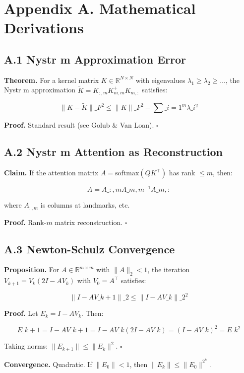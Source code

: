 
\section{Appendix A. Mathematical Derivations}

\subsection{A.1 Nystr m Approximation Error}

\textbf{Theorem.} For a kernel matrix $K \in \mathbb{R}^{N \times N}$ with 
eigenvalues $\lambda_1 \geq \lambda_2 \geq \dots$, the Nystr m 
approximation $\tilde{K} = K_{:, m} K_{m, m}^+ K_{m, :}$ satisfies:

\[
\|K - \tilde{K}\|\_F^2 \leq \|K\|\_F^2 - \sum\_{i=1}^{m} \lambda\_i^2
\tag{A.1}
\]

\textbf{Proof.} Standard result (see Golub \& Van Loan). $\square$

\subsection{A.2 Nystr m Attention as Reconstruction}

\textbf{Claim.} If the attention matrix $A = \text{softmax}(Q K^\top)$ has rank $\leq m$, 
then:

\[
A = A\_{:, m} A\_{m, m}^{-1} A\_{m, :}
\tag{A.2}
\]

where $A_{:, m}$ is columns at landmarks, etc.

\textbf{Proof.} Rank-$m$ matrix reconstruction. $\square$

\subsection{A.3 Newton-Schulz Convergence}

\textbf{Proposition.} For $A \in \mathbb{R}^{m \times m}$ with $\|A\|_2 < 1$, 
the iteration $V_{k+1} = V_k (2I - A V_k)$ with $V_0 = A^\top$ satisfies:

\[
\|I - A V\_{k+1}\|\_2 \leq \|I - A V\_k\|\_2^2
\tag{A.3}
\]

\textbf{Proof.} Let $E_k = I - A V_k$. Then:

\[
E\_{k+1} = I - A V\_{k+1} = I - A V\_k (2I - A V\_k) = (I - A V\_k)^2 = E\_k^2
\tag{A.4}
\]

Taking norms: $\|E_{k+1}\| \leq \|E_k\|^2$. $\square$

\textbf{Convergence.} Quadratic. If $\|E_0\| < 1$, then $\|E_k\| \leq \|E_0\|^{2^k}$.

